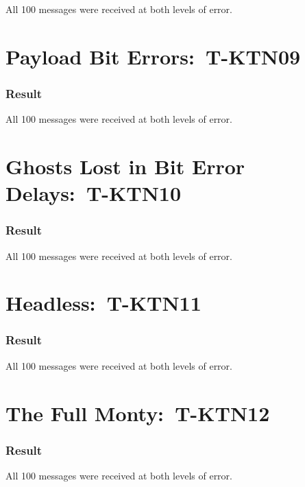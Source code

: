 \documentclass{article}
\begin{document}
All 100 messages were received at both levels of error.

\section{Payload Bit Errors:\ T-KTN09}

\subsubsection{Result}

All 100 messages were received at both levels of error.

\section{Ghosts Lost in Bit Error Delays:\ T-KTN10}

\subsubsection{Result}

All 100 messages were received at both levels of error.

\section{Headless:\ T-KTN11}

\subsubsection{Result}

All 100 messages were received at both levels of error.

\section{The Full Monty:\ T-KTN12}

\subsubsection{Result}

All 100 messages were received at both levels of error.
\end{document}
